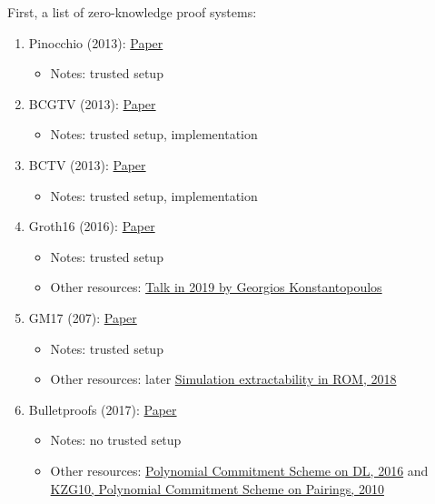 {First, a list of zero-knowledge proof systems:

\begin{enumerate}
	\item Pinocchio (2013): \href{https://eprint.iacr.org/2013/279.pdf}{{Paper}}
	\begin{itemize}[label={--}]
		\item Notes: trusted setup
	\end{itemize}

	\item BCGTV (2013): \href{https://eprint.iacr.org/2013/507.pdf}{{Paper}}
	\begin{itemize}[label={--}]
		\item Notes: trusted setup, implementation
	\end{itemize}

	\item BCTV (2013): \href{https://eprint.iacr.org/2013/879.pdf}{{Paper}}
	\begin{itemize}[label={--}]
		\item Notes: trusted setup, implementation
	\end{itemize}

	\item Groth16 (2016): 	\href{https://eprint.iacr.org/2016/260.pdf}{Paper}
	\begin{itemize}[label={--}]
		\item Notes: trusted setup
		\item Other resources: \href{https://www.gakonst.com/zksummit2019.pdf}{Talk in 2019 by Georgios Konstantopoulos}
	\end{itemize}

	\item GM17 (207): 	\href{https://eprint.iacr.org/2017/540.pdf}{Paper}
	\begin{itemize}[label={--}]
		\item Notes: trusted setup
		\item Other resources: later \href{https://eprint.iacr.org/2018/187}{Simulation extractability in ROM, 2018}
	\end{itemize}

	\item Bulletproofs (2017): \href{https://eprint.iacr.org/2017/1066.pdf}{Paper}
	\begin{itemize}[label={--}]
		\item Notes: no trusted setup
		\item Other resources: \href{https://eprint.iacr.org/2016/263.pdf}{Polynomial Commitment Scheme on DL, 2016} and \href{https://www.iacr.org/archive/asiacrypt2010/6477178/6477178.pdf}{KZG10, Polynomial Commitment Scheme on Pairings, 2010}
	\end{itemize}


\end{enumerate}}
